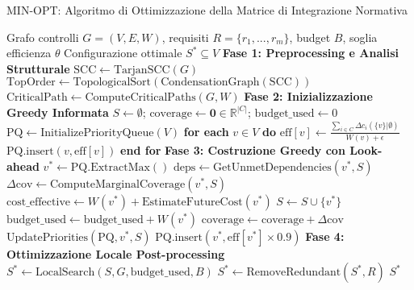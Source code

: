 \begin{algorithm}[H]
\caption{MIN-OPT: Algoritmo di Ottimizzazione della Matrice di Integrazione Normativa}
\label{alg:min_opt_detailed}
\begin{algorithmic}[1]
\Require Grafo controlli $G=(V,E,W)$, requisiti $R = \{r_1, ..., r_m\}$, budget $B$, soglia efficienza $\theta$
\Ensure Configurazione ottimale $S^* \subseteq V$
\State \textbf{Fase 1: Preprocessing e Analisi Strutturale}
\State $\text{SCC} \leftarrow \text{TarjanSCC}(G)$ 
\State $\text{TopOrder} \leftarrow \text{TopologicalSort}(\text{CondensationGraph}(\text{SCC}))$
\State $\text{CriticalPath} \leftarrow \text{ComputeCriticalPaths}(G, W)$
\State
\State \textbf{Fase 2: Inizializzazione Greedy Informata}
\State $S \leftarrow \emptyset$; $\text{coverage} \leftarrow \mathbf{0} \in \mathbb{R}^{|C|}$; $\text{budget\_used} \leftarrow 0$
\State $\text{PQ} \leftarrow \text{InitializePriorityQueue}(V)$ 
\State \textbf{for each} $v \in V$ \textbf{do}
\State \quad $\text{eff}[v] \leftarrow \frac{\sum_{i \in C} \Delta c_i(\{v\} | \emptyset)}{W(v) + \epsilon}$ 
\State \quad $\text{PQ.insert}(v, \text{eff}[v])$
\State \textbf{end for}
\State
\State \textbf{Fase 3: Costruzione Greedy con Look-ahead}
    \State $v^* \leftarrow \text{PQ.ExtractMax}()$
    \State $\text{deps} \leftarrow \text{GetUnmetDependencies}(v^*, S)$
     
        \State $\Delta\text{cov} \leftarrow \text{ComputeMarginalCoverage}(v^*, S)$
        \State $\text{cost\_effective} \leftarrow W(v^*) + \text{EstimateFutureCost}(v^*)$
            \State $S \leftarrow S \cup \{v^*\}$
            \State $\text{budget\_used} \leftarrow \text{budget\_used} + W(v^*)$
            \State $\text{coverage} \leftarrow \text{coverage} + \Delta\text{cov}$
            \State $\text{UpdatePriorities}(\text{PQ}, v^*, S)$ 
        \EndIf
    \Else
        \State $\text{PQ.insert}(v^*, \text{eff}[v^*] \times 0.9)$ 
    \EndIf
\EndWhile
\State
\State \textbf{Fase 4: Ottimizzazione Locale Post-processing}
\State $S^* \leftarrow \text{LocalSearch}(S, G, \text{budget\_used}, B)$
\State $S^* \leftarrow \text{RemoveRedundant}(S^*, R)$ 
\State \Return $S^*$
\end{algorithmic}
\end{algorithm}

